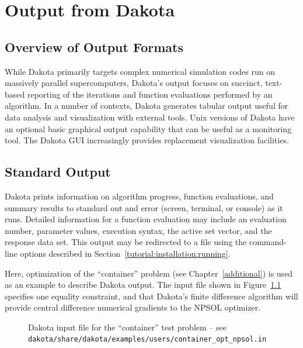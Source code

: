 \chapter{Output from Dakota}\label{output}

\section{Overview of Output Formats}\label{output:overview}

While Dakota primarily targets complex numerical simulation codes run
on massively parallel supercomputers, Dakota's output focuses on
succinct, text-based reporting of the iterations and function
evaluations performed by an algorithm. In a number of contexts, Dakota
generates tabular output useful for data analysis and visualization
with external tools.  Unix versions of Dakota have an optional basic
graphical output capability that can be useful as a monitoring tool.
The Dakota GUI increasingly provides replacement visualization
facilities.

\section{Standard Output}\label{output:standard}

Dakota prints information on algorithm progress, function evaluations,
and summary results to standard out and error (screen, terminal, or
console) as it runs.  Detailed information for a function evaluation
may include an evaluation number, parameter values, execution syntax,
the active set vector, and the response data set.  This output may be
redirected to a file using the command-line options described in
Section~\ref{tutorial:installation:running}.

Here, optimization of the ``container'' problem (see
Chapter~\ref{additional}) is used as an example to describe Dakota
output. The input file shown in Figure~\ref{output:incont} specifies
one equality constraint, and that Dakota's finite difference algorithm
will provide central difference numerical gradients to the NPSOL
optimizer.
\begin{figure}
  \begin{small}
    \begin{bigbox}
    \end{bigbox}
  \end{small}
  \caption{Dakota input file for the ``container'' test problem --
see \texttt{dakota/share/dakota/examples/users/container\_opt\_npsol.in} }
  \label{output:incont}
\end{figure}

